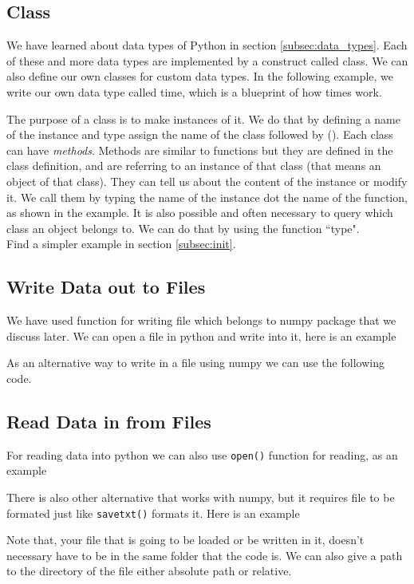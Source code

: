 \documentclass[10pt,a4paper]{article}
\newcommand{\te}{\texttt}
\begin{document}
\subsection{Class}
\label{class}
We have learned about data types of Python in section \ref{subsec:data_types}. Each of these and more data types are implemented by a construct called class. We can also define our own classes for custom data types. In the following example, we write our own data type called time, which is a blueprint of how times work.

The purpose of a class is to make instances of it. We do that by defining a name of the instance and type assign the name of the class followed by (). Each class can have \textit{methods}. Methods are similar to functions but they are defined in the class definition, and are referring to an instance of that class (that means an object of that class). They can tell us about the content of the instance or modify it. We call them by typing the name of the instance dot the name of the function, as shown in the example.
It is also possible and often necessary to query which class an object belongs to. We can do that by using the function ``type".
\\
Find a simpler example in section \ref{subsec:init}.


\subsection{Write Data out to Files}

We have used function for writing file which belongs to numpy package that we discuss later. 
We can open a file in python and write into it, here is an example

As an alternative way to write in a file using numpy we can use the following code.



\subsection{Read Data in from Files} 
For reading data into python we can also use \texttt{open()} function for reading, as an example 

There is also other alternative that works with numpy, but it requires file to be formated just like \te{savetxt()} formats it.  Here is an example

Note that, your file that is going to be loaded or be written in it, doesn't necessary have to be in the same folder that the code is. We can also give a path to the directory of the file either absolute path or relative.
\end{document}
